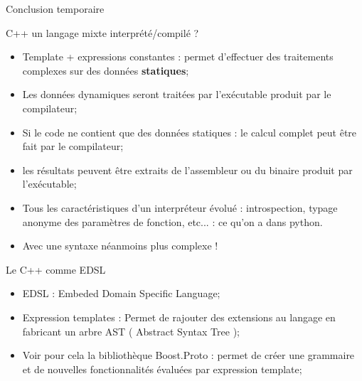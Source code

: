 \documentclass[handout,10pt]{beamer}
\begin{document}
\begin{frame}[fragile]{Conclusion temporaire}
\tiny
\begin{block}{C++ un langage mixte interprété/compilé ?}
\begin{itemize}
\item {\color{red}Template + expressions constantes} : permet d'effectuer des traitements complexes sur des données \textbf{statiques};
\item Les données dynamiques seront traitées par l'exécutable produit par le compilateur;
\item Si le code ne contient que des données statiques : le calcul complet peut être fait par le compilateur;
\item les résultats peuvent être extraits de l'assembleur ou du binaire produit par l'exécutable;
\item Tous les caractéristiques d'un interpréteur évolué : introspection, typage anonyme des paramètres de fonction, etc... : ce qu'on a dans python.
\item Avec une syntaxe néanmoins plus complexe !
\end{itemize}
\end{block}

\begin{exampleblock}{Le C++ comme EDSL}
\begin{itemize}
\item EDSL : Embeded Domain Specific Language;
\item Expression templates : Permet de rajouter des extensions au langage en fabricant un arbre AST ( Abstract Syntax Tree );
\item Voir pour cela la bibliothèque Boost.Proto : permet de créer une grammaire et de nouvelles fonctionnalités évaluées par expression template;
\end{itemize}
\end{exampleblock}
\end{frame}
\end{document}
